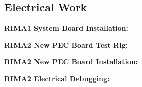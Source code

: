 \subsection{Electrical Work}

\textbf{RIMA1 System Board Installation:}

\newpage
\textbf{RIMA2 New PEC Board Test Rig:}

\newpage
\textbf{RIMA2 New PEC Board Installation:}


\newpage
\textbf{RIMA2 Electrical Debugging:}